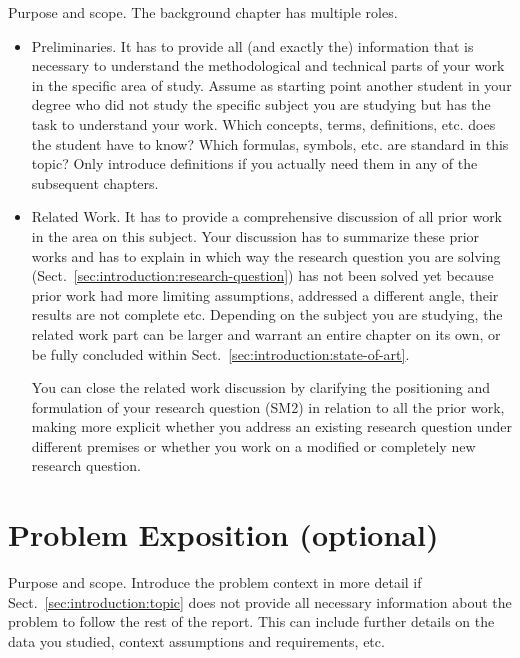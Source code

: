 \documentclass[12pt,a4paper,footinclude=true,twoside,headinclude=true]{report}
\begin{document}
\textsf{Purpose and scope}. The background chapter has multiple roles.
\begin{itemize}

    \item \textsf{Preliminaries.} It has to provide all (and exactly the) information that is necessary to understand the methodological and technical parts of your work in the specific area of study. Assume as starting point another student in your degree who did not study the specific subject you are studying but has the task to understand your work. Which concepts, terms, definitions, etc. does the student have to know? Which formulas, symbols, etc. are standard in this topic? Only introduce definitions if you actually need them in any of the subsequent chapters.
    
    \item \textsf{Related Work.} It has to provide a comprehensive discussion of all prior work in the area on this subject. Your discussion has to summarize these prior works and has to explain in which way the research question you are solving (Sect.~\ref{sec:introduction:research-question}) has not been solved yet because prior work had more limiting assumptions, addressed a different angle, their results are not complete etc. Depending on the subject you are studying, the related work part can be larger and warrant an entire chapter on its own, or be fully concluded within Sect.~\ref{sec:introduction:state-of-art}. 
    
    You can close the related work discussion by clarifying the positioning and formulation of your research question (SM2) in relation to all the prior work, making more explicit whether you address an existing research question under different premises or whether you work on a modified or completely new research question.
\end{itemize}

\chapter{Problem Exposition (optional)}\label{sec:problem-exposition}

\textsf{Purpose and scope}. Introduce the problem context in more detail if Sect.~\ref{sec:introduction:topic} does not provide all necessary information about the problem to follow the rest of the report. This can include further details on the data you studied, context assumptions and requirements, etc. 
\end{document}
